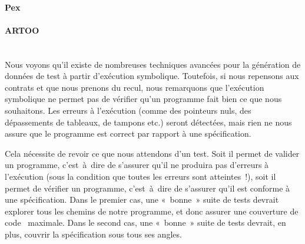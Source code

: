 \paragraph{Pex} 

\paragraph{ARTOO}  \\

Nous voyons qu'il existe de nombreuses techniques avancées pour la génération de
données de test à partir d'exécution symbolique. Toutefois, si nous repensons
aux contrats et que nous prenons du recul, nous remarquons que l'exécution
symbolique ne permet pas de vérifier qu'un programme fait bien ce que nous
souhaitons. Les erreurs à l'exécution (comme des pointeurs nuls, des
dépassements de tableaux, de tampons etc.) seront détectées, mais rien ne nous
assure que le programme est correct par rapport à une spécification.

Cela nécessite de revoir ce que nous attendons d'un test. Soit il permet de
valider un programme, c'est~à~dire de s'assurer qu'il ne produira pas d'erreurs
à l'exécution (sous la condition que toutes les erreurs sont atteintes~!), soit
il permet de vérifier un programme, c'est~à~dire de s'assurer qu'il est conforme
à une spécification. Dans le premier cas, une «~bonne~» suite de tests devrait
explorer tous les chemins de notre programme, et donc assurer une couverture de
code~ maximale. Dans le second cas, une «~bonne~»
suite de tests devrait, en plus, couvrir la spécification sous tous ses angles.





\vspace{5em}

